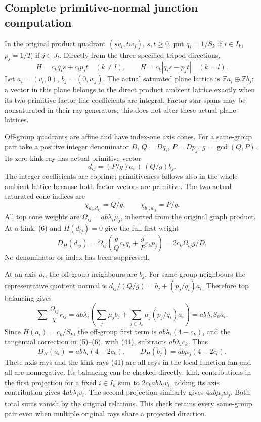 \documentclass[
  11pt,
]{article}
\begin{document}
\subsection{Complete primitive-normal junction
computation}\label{complete-primitive-normal-junction-computation}

In the original product quadrant \((s v_i,t w_j)\), \(s,t\geq0\), put
\(q_i=1/S_k\) if \(i\in I_k\), \(p_j=1/T_l\) if \(j\in J_l\). Directly
from the three specified tripod directions, \[
 H=c_kq_i s+c_lp_j t\quad(k\ne l),\qquad
 H=c_k|q_i s-p_jt|\quad(k=l).                              \tag{40}
\] Let \(a_i=(v_i,0)\), \(b_j=(0,w_j)\). The actual saturated plane
lattice is \(\mathbb{Z}a_i\oplus\mathbb{Z}b_j\): a vector in this plane
belongs to the direct product ambient lattice exactly when its two
primitive factor-line coefficients are integral. Factor star spans may
be nonsaturated in their ray generators; this does not alter these
actual plane lattices.

Off-group quadrants are affine and have index-one axis cones. For a
same-group pair take a positive integer denominator \(D\), \(Q=Dq_i\),
\(P=Dp_j\), \(g=\gcd(Q,P)\). Its zero kink ray has actual primitive
vector \[
                            d_{ij}=(P/g)a_i+(Q/g)b_j.        \tag{41}
\] The integer coefficients are coprime; primitiveness follows also in
the whole ambient lattice because both factor vectors are primitive. The
two actual saturated cone indices are \[
                    \chi_{a_i,d_{ij}}=Q/g,\qquad
                    \chi_{b_j,d_{ij}}=P/g.                 \tag{42}
\] All top cone weights are \(\Omega_{ij}=ab\lambda_i\mu_j\), inherited
from the original graph product. At a kink, (6) and \(H(d_{ij})=0\) give
the full first weight \[
 D_H(d_{ij})=\Omega_{ij}\left(\frac gQ c_kq_i+\frac gP c_kp_j\right)
                             =2c_k\Omega_{ij}g/D.           \tag{43}
\] No denominator or index has been suppressed.

At an axis \(a_i\), the off-group neighbours are \(b_j\). For same-group
neighbours the representative quotient normal is
\(d_{ij}/(Q/g)=b_j+(p_j/q_i)a_i\). Therefore top balancing gives \[
 \sum\frac{\Omega_{ij}}{\chi}r_{ij}
       =ab\lambda_i\left(\sum_j\mu_jb_j+
                    \sum_{j\in J_k}\mu_j(p_j/q_i)a_i\right)
       =ab\lambda_i S_k a_i.                               \tag{44}
\] Since \(H(a_i)=c_k/S_k\), the off-group first term is
\(ab\lambda_i(4-c_k)\), and the tangential correction in (5)--(6), with
(44), subtracts \(ab\lambda_i c_k\). Thus \[
 D_H(a_i)=ab\lambda_i(4-2c_k),\qquad
 D_H(b_j)=ab\mu_j(4-2c_l).                                 \tag{45}
\] These axis rays and the kink rays (41) are all rays in the local
function fan and all are nonnegative. Its balancing can be checked
directly: kink contributions in the first projection for a fixed
\(i\in I_k\) sum to \(2c_kab\lambda_i v_i\), adding its axis
contribution gives \(4ab\lambda_i v_i\). The second projection similarly
gives \(4ab\mu_jw_j\). Both total sums vanish by the original relations.
This check retains every same-group pair even when multiple original
rays share a projected direction.
\end{document}
